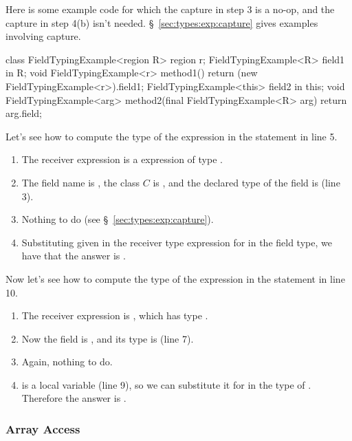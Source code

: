 Here is some example code for which the capture in step 3 is a no-op,
and the capture in step 4(b) isn't needed.
\S~\ref{sec:types:exp:capture} gives examples involving capture.
%
\begin{numbereddpjlisting}
class FieldTypingExample<region R> {
    region r;
    FieldTypingExample<R> field1 in R;
    void FieldTypingExample<r> method1() {
        return (new FieldTypingExample<r>).field1;
    }        
    FieldTypingExample<this> field2 in this;
    void FieldTypingExample<arg> 
      method2(final FieldTypingExample<R> arg) {
        return arg.field;
    }
}
\end{numbereddpjlisting}
%

Let's see how to compute the type of the expression in the
 statement in line 5.  
%
\begin{enumerate}
%
\item The receiver expression is a  expression of type
  .
%
\item The field name is , the class $C$ is
  , and the declared type of the field is
   (line 3).
%
\item Nothing to do (see \S~\ref{sec:types:exp:capture}).  
%
\item Substituting  given in the receiver type
  expression for  in the field type, we have that the answer is
  .
%
\end{enumerate} 

Now let's see how to compute the type of the expression in the
 statement in line 10.  
%
\begin{enumerate}
%
\item The receiver expression is , which has type
  .  
%
\item Now the field is , and its type is
   (line 7).
%
\item Again, nothing to do.
%
\item {} is a  local variable (line 9), so we can
  substitute it for  in the type of .  Therefore
  the answer is .
%
\end{enumerate}

\subsubsection{Array Access%
\label{sec:types:exp:array}}

